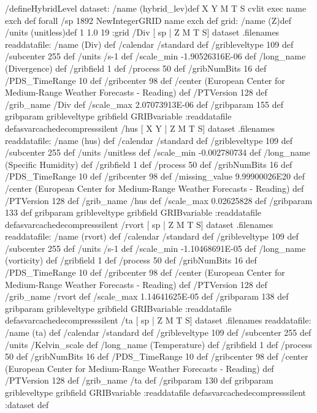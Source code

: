 \begin{ingrid}
/defineHybridLevel {
dataset:
/name (hybrid_lev)def
{ X Y M T S} cvlit { exec name exch def} forall
/sp 1892 NewIntegerGRID name exch def
grid:
/name (Z)def
/units (unitless)def
 1 1.0 19
:grid
 /Div{
[ sp | Z M T S] dataset .filenames readdatafile:
/name (Div) def
 /calendar /standard def
 /gribleveltype 109 def
 /subcenter 255 def
 /units /s-1 def
 /scale_min -1.90526316E-06 def
 /long_name (Divergence) def
 /gribfield 1 def
 /process 50 def
 /gribNumBits 16 def
 /PDS_TimeRange 10 def
 /gribcenter 98 def
 /center (European Center for Medium-Range Weather Forecasts - Reading) def
 /PTVersion 128 def
 /grib_name /Div def
 /scale_max 2.07073913E-06 def
 /gribparam 155 def
 gribparam gribleveltype gribfield GRIBvariable
 :readdatafile
}defasvarcachedecompresssilent
 /hus{
[ X Y | Z M T S] dataset .filenames readdatafile:
/name (hus) def
 /calendar /standard def
 /gribleveltype 109 def
 /subcenter 255 def
 /units /unitless def
 /scale_min -0.002780734 def
 /long_name (Specific Humidity) def
 /gribfield 1 def
 /process 50 def
 /gribNumBits 16 def
 /PDS_TimeRange 10 def
 /gribcenter 98 def
 /missing_value 9.99900026E20 def
 /center (European Center for Medium-Range Weather Forecasts - Reading) def
 /PTVersion 128 def
 /grib_name /hus def
 /scale_max 0.02625828 def
 /gribparam 133 def
 gribparam gribleveltype gribfield GRIBvariable
 :readdatafile
}defasvarcachedecompresssilent
 /rvort{
[ sp | Z M T S] dataset .filenames readdatafile:
/name (rvort) def
 /calendar /standard def
 /gribleveltype 109 def
 /subcenter 255 def
 /units /s-1 def
 /scale_min -1.10468691E-05 def
 /long_name (vorticity) def
 /gribfield 1 def
 /process 50 def
 /gribNumBits 16 def
 /PDS_TimeRange 10 def
 /gribcenter 98 def
 /center (European Center for Medium-Range Weather Forecasts - Reading) def
 /PTVersion 128 def
 /grib_name /rvort def
 /scale_max 1.14641625E-05 def
 /gribparam 138 def
 gribparam gribleveltype gribfield GRIBvariable
 :readdatafile
}defasvarcachedecompresssilent
 /ta{
[ sp | Z M T S] dataset .filenames readdatafile:
/name (ta) def
 /calendar /standard def
 /gribleveltype 109 def
 /subcenter 255 def
 /units /Kelvin_scale def
 /long_name (Temperature) def
 /gribfield 1 def
 /process 50 def
 /gribNumBits 16 def
 /PDS_TimeRange 10 def
 /gribcenter 98 def
 /center (European Center for Medium-Range Weather Forecasts - Reading) def
 /PTVersion 128 def
 /grib_name /ta def
 /gribparam 130 def
 gribparam gribleveltype gribfield GRIBvariable
 :readdatafile
}defasvarcachedecompresssilent
:dataset
} def
\end{ingrid}
